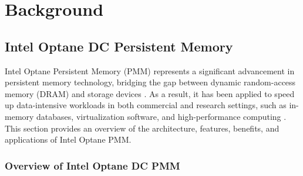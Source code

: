 


\chapter[Background]{Background}

\section{Intel Optane DC Persistent Memory}

Intel Optane Persistent Memory (PMM) represents a significant advancement in persistent memory technology, bridging the gap between dynamic random-access memory (DRAM) and storage devices \cite{scargall2020pmem}. As a result, it has been applied to speed up data-intensive workloads in both commercial and research settings, such as in-memory databases, virtualization software, and high-performance computing \cite{peng2020demystifying,SolveMod32:online}. This section provides an overview of the architecture, features, benefits, and applications of Intel Optane PMM.

\subsection{Overview of Intel Optane DC PMM}

